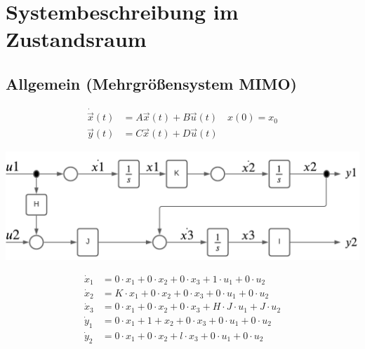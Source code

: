\newpage
\section{Systembeschreibung im Zustandsraum}
\subsection{Allgemein (Mehrgrößensystem MIMO) }
\begin{mdframed}[style=exercise]
	\vspace{-1em}
	\begin{align*}
		\dot{\Vec{x}}(t) & = A\vec{x}(t) + B\vec{u}(t) \quad x(0) = x_{0} \\
		\vec{y}(t)       & = C\vec{x}(t) + D\vec{u}(t)
	\end{align*}
\end{mdframed}

\begin{center}
	\includegraphics[width=0.96\columnwidth]{Figures/Signalflussplan.png}
\end{center}

\begin{mdframed}[style=exercise]
	\begin{align*}
		\dot{x}_{1} & = 0\cdot x_{1} +0\cdot x_{2} +0\cdot x_{3} +1\cdot u_{1}+0\cdot u_{2}        \\
		\dot{x}_{2} & = K\cdot x_{1} +0\cdot x_{2} +0\cdot x_{3} +0\cdot u_{1}+0\cdot u_{2}        \\
		\dot{x}_{3} & = 0\cdot x_{1} +0\cdot x_{2} +0\cdot x_{3} +H\cdot J\cdot u_{1}+J\cdot u_{2} \\
		\dot{y}_{1} & = 0\cdot x_{1} +1+x_{2} +0\cdot x_{3} +0\cdot u_{1}+0\cdot u_{2}             \\
		\dot{y}_{2} & = 0\cdot x_{1} +0\cdot x_{2} +l\cdot x_{3} +0\cdot u_{1}+0\cdot u_{2}        \\
	\end{align*}
\end{mdframed}

